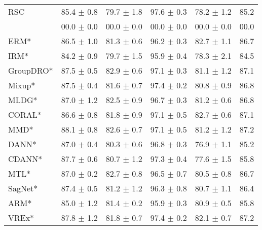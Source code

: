 \begin{table*}
\begin{center}
\begin{tabular}{lccccc}
RSC                  & 85.4 $\pm$ 0.8       & 79.7 $\pm$ 1.8       & 97.6 $\pm$ 0.3       & 78.2 $\pm$ 1.2       & 85.2                 \\
\divcams 	   & 00.0 $\pm$ 0.0       & 00.0 $\pm$ 0.0        & 00.0 $\pm$ 0.0       & 00.0 $\pm$ 0.0       & 00.0                \\
\midrule
ERM*                  & 86.5 $\pm$ 1.0       & 81.3 $\pm$ 0.6       & 96.2 $\pm$ 0.3       & 82.7 $\pm$ 1.1       & 86.7                 \\
IRM*                  & 84.2 $\pm$ 0.9       & 79.7 $\pm$ 1.5       & 95.9 $\pm$ 0.4       & 78.3 $\pm$ 2.1       & 84.5                 \\
GroupDRO*             & 87.5 $\pm$ 0.5       & 82.9 $\pm$ 0.6       & 97.1 $\pm$ 0.3       & 81.1 $\pm$ 1.2       & 87.1                 \\
Mixup*                & 87.5 $\pm$ 0.4       & 81.6 $\pm$ 0.7       & 97.4 $\pm$ 0.2       & 80.8 $\pm$ 0.9       & 86.8                 \\
MLDG*                 & 87.0 $\pm$ 1.2       & 82.5 $\pm$ 0.9       & 96.7 $\pm$ 0.3       & 81.2 $\pm$ 0.6       & 86.8                 \\
CORAL*                & 86.6 $\pm$ 0.8       & 81.8 $\pm$ 0.9       & 97.1 $\pm$ 0.5       & 82.7 $\pm$ 0.6       & 87.1                 \\
MMD*                  & 88.1 $\pm$ 0.8       & 82.6 $\pm$ 0.7       & 97.1 $\pm$ 0.5       & 81.2 $\pm$ 1.2       & 87.2                 \\
DANN*                 & 87.0 $\pm$ 0.4       & 80.3 $\pm$ 0.6       & 96.8 $\pm$ 0.3       & 76.9 $\pm$ 1.1       & 85.2                 \\
CDANN*                & 87.7 $\pm$ 0.6       & 80.7 $\pm$ 1.2       & 97.3 $\pm$ 0.4       & 77.6 $\pm$ 1.5       & 85.8                 \\
MTL*                  & 87.0 $\pm$ 0.2       & 82.7 $\pm$ 0.8       & 96.5 $\pm$ 0.7       & 80.5 $\pm$ 0.8       & 86.7                 \\
SagNet*               & 87.4 $\pm$ 0.5       & 81.2 $\pm$ 1.2       & 96.3 $\pm$ 0.8       & 80.7 $\pm$ 1.1       & 86.4                 \\
ARM*                  & 85.0 $\pm$ 1.2       & 81.4 $\pm$ 0.2       & 95.9 $\pm$ 0.3       & 80.9 $\pm$ 0.5       & 85.8                 \\
VREx*                 & 87.8 $\pm$ 1.2       & 81.8 $\pm$ 0.7       & 97.4 $\pm$ 0.2       & 82.1 $\pm$ 0.7       & 87.2                 \\

\end{tabular}
\end{center}
\end{table*}
